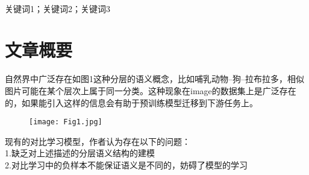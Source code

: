 \documentclass[a4paper, 12pt, centering]{article}
\title{\yihao{模式识别报告}}
\author{\sanhao XiaoX\\[2ex]
\sanhao Demon Killer\\[2ex]
}
\date{\sanhao\today}
\makeatletter
\newcommand*{\hei}{\CJKfamily{zhhei}}
\newcommand{\sihao}{\fontsize{14pt}{\baselineskip}\selectfont}
\newenvironment{enabstract}
\newenvironment{keys}
\newenvironment{enkeys}
\renewcommand\section{\@startsection{section}{1}{\z@}%
{-1.5ex \@plus -.5ex \@minus -.2ex}%
{.5ex \@plus .1ex}%
{\normalfont\sihao\bf\hei}}
\makeatother
\begin{document}




\
\vspace{10cm}
\begingroup
\let\newpage\relax%
\maketitle
\endgroup
\newpage



\begin{abstract}
论文选自CVPR2022的一篇，题目为《HCSC: Hierarchical Contrastive Selective Coding》。来自上海交通大学、Mila 魁北克人工智能研究所以及字节跳动的研究者提出了一种具有层级语义结构的自监督表征学习框架，在 ImageNet 数据集上预训练的模型在多个下游任务中取得了 SOTA 性能。\\
本报告将从文章概要，研究背景，知识联系，个人收获几方面做简要汇报。
\end{abstract}

\begin{keys}
关键词1；关键词2；关键词3
\end{keys}


\newpage

\tableofcontents
\newpage

\section{文章概要}
自然界中广泛存在如图1这种分层的语义概念，比如哺乳动物--狗--拉布拉多，相似图片可能在某个层次上属于同一分类。这种现象在image的数据集上是广泛存在的，如果能引入这样的信息会有助于预训练模型迁移到下游任务上。
\begin{figure}[H] %
\centering %
\texttt{[image: Fig1.jpg]} %
\label{Fig.main} %
\end{figure}
现有的对比学习模型，作者认为存在以下的问题：\\
1.缺乏对上述描述的分层语义结构的建模\\
2.对比学习中的负样本不能保证语义是不同的，妨碍了模型的学习\\
\end{document}

